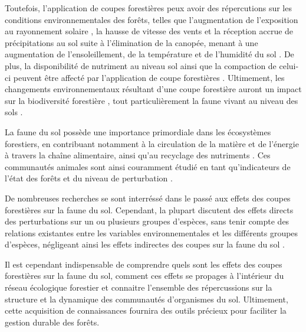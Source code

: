 Toutefois, l'application de coupes forestières peux avoir des répercutions sur les conditions environnementales des forêts, 
telles que l'augmentation de l'exposition au rayonnement solaire , la hausse de vitesse des vents et la réception accrue de précipitations au sol suite à l'élimination de la canopée, 
menant à une augmentation de l'ensoleillement, de la température et de l'humidité du sol \citep{Keenan1993ecologicaleffects,Lindo2003Microbialbiomass,Heithecker2007Edgerelatedgradients}.
De plus, la disponibilité de nutriment au niveau sol ainsi que la compaction de celui-ci peuvent être affecté par l'application de coupe forestières \citep{Battigelli2004Shorttermimpact,Covington1981Changesforest,Lindo2003Microbialbiomass,rousseauLongtermEffectsBiomass2018}. 
Ultimement, les changements environnementaux résultant d'une coupe forestière auront un impact sur la biodiversité forestière \citep{Chaudhary2016Impactforest,Fedrowitz2014Canretention,Paillet2010Biodiversitydifferences}, 
tout particulièrement la faune vivant au niveau des sols \citep{Chaudhary2016Impactforest,Lindo2003Microbialbiomass,Kudrin2023metaanalysiseffects}.

La faune du sol possède une importance primordiale dans les écosystèmes forestiers, en contribuant notamment à la circulation de la matière et de l'énergie à travers la chaîne alimentaire, ainsi qu'au recyclage des nutriments \citep{Kudrin2023metaanalysiseffects}.
Ces communautés animales sont ainsi couramment étudié en tant qu'indicateurs de l'état des forêts et du niveau de perturbation \citep{birdChangesSoilLitter2004,Maleque2009Arthropodsbioindicators,pongeVerticalDistributionCollembola2000}.

De nombreuses recherches se sont interréssé dans le passé aux effets des coupes forestières sur la faune du sol. 
Cependant, la plupart discutent des effets directs des perturbations sur un ou plusieurs groupes d'espèces, 
sans tenir compte des relations existantes entre les variables environnementales et les différents groupes d'espèces, 
négligeant ainsi les effets indirectes des coupes sur la faune du sol \citep{graceStructuralEquationModeling2008,josephIntegratingOccupancyModels2016,Kudrin2023metaanalysiseffects,Pollierer2021Diversityfunctional}. 

Il est cependant indispensable de comprendre quels sont les effets des coupes forestières sur la faune du sol, 
comment ces effets se propages à l'intérieur du réseau écologique forestier et connaitre l'ensemble des répercussions sur la structure 
et la dynamique des communautés d'organismes du sol. 
Ultimement, cette acquisition de connaissances fournira des outils précieux pour faciliter la gestion durable des forêts.


